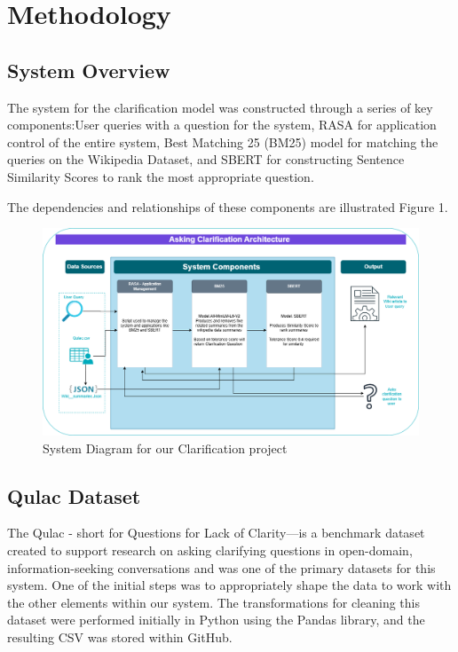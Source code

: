 \documentclass[11pt]{article}
\begin{document}
\section{Methodology}
\subsection{System Overview}
The system for the clarification model was constructed through a series of key components:User queries with a question for the system, RASA for application control of the entire system, Best Matching 25 (BM25) model for matching the queries on the Wikipedia Dataset, and SBERT for constructing Sentence Similarity Scores to rank the most appropriate question.

The dependencies and relationships of these components are illustrated Figure 1.

\begin{figure}[htbp]
  \includegraphics[width=\linewidth]{./img/system_diagram.png}
  \caption{System Diagram for our Clarification project}
  \label{fig:sys_diag}
\end{figure}

\subsection{Qulac Dataset}
The Qulac - short for Questions for Lack of Clarity—is a benchmark dataset created to support research on asking clarifying questions in open-domain, information-seeking conversations and was one of the primary datasets for this system. One of the initial steps was to appropriately shape the data to work with the other elements within our system. The transformations for cleaning this dataset were performed initially in Python using the Pandas library, and the resulting CSV was stored within GitHub.
\end{document}
